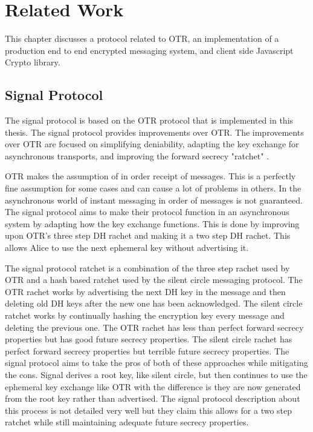 \chapter{Related Work}


This chapter discusses a protocol related to OTR, an implementation of a production end to end encrypted messaging system, and client side Javascript Crypto library.


\section{Signal Protocol} 


The signal protocol is based on the OTR protocol that is implemented in this thesis. The signal protocol provides improvements over OTR. The improvements over OTR are focused on simplifying deniability, adapting the key exchange for asynchronous transports, and improving the forward secrecy "ratchet" \cite{whisper-overview}.


OTR makes the assumption of in order receipt of messages. This is a perfectly fine assumption for some cases and can cause a lot of problems in others. In the asynchronous world of instant messaging in order of messages is not guaranteed. The signal protocol aims to make their protocol function in an asynchronous system by adapting how the key exchange functions. This is done by improving upon OTR’s three step DH rachet and making it a two step DH rachet. This allows Alice to use the next ephemeral key without advertising it.


The signal protocol ratchet is a combination of the three step rachet used by OTR and a hash based ratchet used by the silent circle messaging protocol. The OTR rachet works by advertising the next DH key in the message and then deleting old DH keys after the new one has been acknowledged. The silent circle ratchet works by continually hashing the encryption key every message and deleting the previous one. The OTR rachet has less than perfect forward secrecy properties but has good future secrecy properties. The silent circle rachet has perfect forward secrecy properties but terrible future secrecy properties. The signal protocol aims to take the pros of both of these approaches while mitigating the cons. Signal derives a root key, like silent circle, but then continues to use the ephemeral key exchange like OTR with the difference is they are now generated from the root key rather than advertised. The signal protocol description about this process is not detailed very well but they claim this allows for a two step ratchet while still maintaining adequate future secrecy properties.
 
